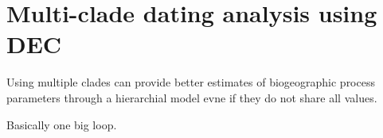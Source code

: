 

\section{Multi-clade dating analysis using DEC}

Using multiple clades can provide better estimates of biogeographic process parameters through a hierarchial model evne if they do not share all values.

Basically one big loop.

%
%
%
%
%
%
%
